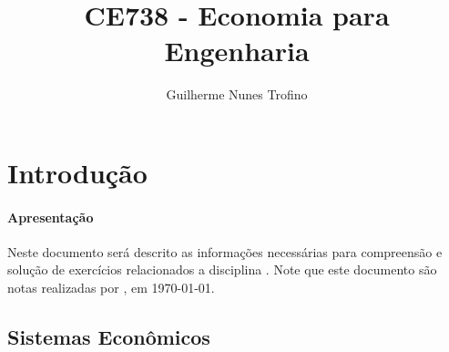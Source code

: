 \documentclass{article}
\title{CE738 - Economia para Engenharia}
\author{Guilherme Nunes Trofino}
\begin{document}
    \maketitle
\newpage

    \tableofcontents
\newpage

    \section{Introdução}
        \paragraph{Apresentação}Neste documento será descrito as informações necessárias para compreensão e solução de exercícios relacionados a disciplina \thetitle . Note que este documento são notas realizadas por \theauthor , em \today.

        \subsection{Sistemas Econômicos}
\end{document}

